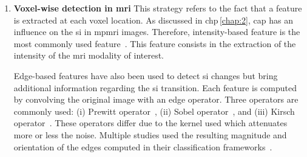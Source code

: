 \begin{enumerate}[leftmargin=*]

\item[] \textbf{Voxel-wise detection in \acs*{mri}}
This strategy refers to the fact that a feature is extracted at each voxel
location.
As discussed in \acs{chp}\,\ref{chap:2}, \ac{cap} has an influence on the
\ac{si} in \ac{mpmri} images.
Therefore, intensity-based feature is the most commonly used
feature~\cite{Ampeliotis2007,Ampeliotis2008,Vos2008,rampun2016computerb,rampun2015classifying,Giannini2013,Artan2009,Artan2010,Chan2003,Langer2009,Litjens2011,Litjens2012,Litjens2014,Liu2009,Ozer2009,Ozer2010,trigui2016classification,trigui2017automatic,cameron2014multiparametric,cameron2016maps,khalvati2015automated,chung2015prostate,giannini2015fully,Niaf2011,Niaf2012,lehaire2014computer,Lemaitre2016thesis}.
This feature consists in the extraction of the intensity of the \ac{mri}
modality of interest.

Edge-based features have also been used to detect \ac{si} changes but bring
additional information regarding the \ac{si} transition.
Each feature is computed by convolving the original image with an edge operator.
Three operators are commonly used: (i) Prewitt operator~\cite{Prewitt1970},
(ii) Sobel operator~\cite{Sobel1970}, and (iii) Kirsch
operator~\cite{Kirsch1971}.
These operators differ due to the kernel used which attenuates more or less the
noise.
Multiple studies used the resulting magnitude and orientation of the edges
computed in their classification
frameworks~\cite{Niaf2011,Niaf2012,Tiwari2009a,Tiwari2010,Tiwari2013,Viswanath2008,Viswanath2011,rampun2016quantitative,rampun2015computer,rampun2016computer,lehaire2014computer,khalvati2015automated,chung2015prostate,Lemaitre2016thesis}.


\end{enumerate}
